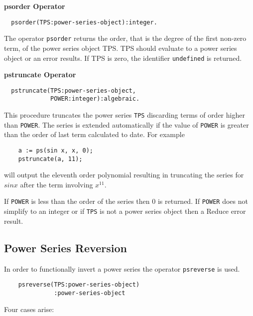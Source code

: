 \textbf{psorder Operator}
\hypertarget{operator:PSORDER}{}
\begin{verbatim}
  psorder(TPS:power-series-object):integer.
\end{verbatim}
The operator \texttt{psorder} returns the order, that is the degree of
the first non-zero term, of the power series object TPS.
TPS should evaluate to a power series object or an error results. If
TPS is zero, the identifier \texttt{undefined} is returned.

\textbf{pstruncate Operator}
\hypertarget{operator:PSTRUNCATE}{}
\begin{verbatim}
  pstruncate(TPS:power-series-object,
             POWER:integer):algebraic.
\end{verbatim}
This procedure truncates the power series \texttt{TPS} discarding terms
of order higher than \texttt{POWER}. The series is extended automatically
if the value of \texttt{POWER} is greater than the order of last term
calculated to date. For example
\begin{verbatim}
    a := ps(sin x, x, 0);
    pstruncate(a, 11);
\end{verbatim}
will output the eleventh order polynomial resulting in truncating the series
for $sin x$ after the term involving $x^{11}$.

If \texttt{POWER} is less than the order of the series then $0$ is
returned.  If \texttt{POWER} does not simplify to an integer or if
\texttt{TPS} is not a power series object then a Reduce error result.


\subsection{Power Series Reversion}
\hypertarget{operator:PSREVERSE}{}
In order to functionally invert a power series the operator \texttt{psreverse}
is used. 
\begin{verbatim}
    psreverse(TPS:power-series-object)
              :power-series-object
\end{verbatim}
Four cases arise:

